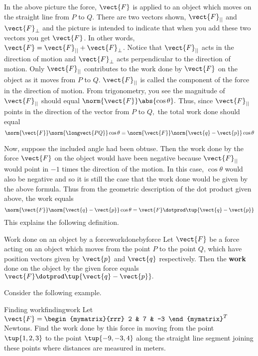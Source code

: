 In the above picture the force, $\vect{F}$ is applied to an object which moves
on the straight line from $P$ to $Q.$ There are two vectors shown, $\vect{F}_{||}$ and $\vect{F}_{\bot }$ and the
picture is intended to indicate that when you add these two vectors you get 
$\vect{F}$. In other words, $\vect{F} = \vect{F}_{||} + \vect{F}_{\bot}$. Notice that
 $\vect{F}_{||}$ acts in the direction of motion and 
$\vect{F}_{\bot }$ acts perpendicular to the direction of motion. Only 
$\vect{F}_{||}$ contributes to the work done by $\vect{F}$ on the object
as it moves from $P$ to $Q$. $\vect{F}_{||}$ is
called the component of the force in
 the direction of motion. From trigonometry, you
see the magnitude of $\vect{F}_{||}$ should equal $\norm{\vect{F}
} \abs{\cos \theta} .$ Thus, since $\vect{F}_{||}$ points
in the direction of the vector from $P$ to $Q,$
the total work done should equal
\begin{equation*}
\norm{\vect{F}} \norm{
\longvect{PQ}} \cos \theta =\norm{
\vect{F}} \norm{\vect{q}-\vect{p}} \cos \theta
\end{equation*}

Now, suppose the included angle had been obtuse. Then the work done by the force 
$\vect{F}$ on the object would have been negative because $\vect{F}_{||}$
would point in $-1$ times the direction of the motion.  In this case, $\cos \theta $ would also be negative and 
so it is still
the case that the work done would be given by the above formula. Thus from
the geometric description of the dot product given above, the work equals
\begin{equation*}
\norm{\vect{F}} \norm{\vect{q}-\vect{p}} \cos
\theta =\vect{F}\dotprod \tup{\vect{q}-\vect{p}} 
\end{equation*}
This explains the following definition.

\begin{definition}{Work done on an object by a force}{workdonebyforce}
Let $\vect{F}$ be a force acting on an object which moves from the point 
$P$ to the point $Q$, which have position vectors given by $\vect{p}$ and $\vect{q}$ respectively.
 Then the \textbf{work} done
 on the object by the given force equals $\vect{F}\dotprod \tup{
\vect{q}-\vect{p}} .$
\end{definition}

Consider the following example.

\begin{example}{Finding work}{findingwork}
Let $\vect{F}=
\begin{mymatrix}{rrr}
2 & 7 & -3
\end{mymatrix}^T$ Newtons. Find the work
done by this force in moving from the point $\tup{1,2,3} $ to the
point $\tup{-9,-3,4} $ along the straight line segment joining these
points where distances are measured in meters.
\end{example}

